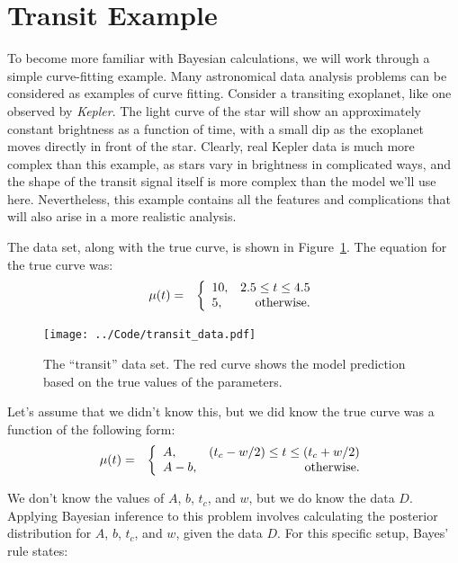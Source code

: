 \section{Transit Example}
To become more familiar with Bayesian calculations, we will work through a
simple curve-fitting example. Many astronomical data analysis problems can be
considered as examples of curve fitting. Consider a transiting exoplanet, like
one observed by {\it Kepler}. The light curve of the star will show an
approximately constant brightness as a function of time, with a small dip as
the exoplanet moves directly in front of the star. Clearly, real Kepler data
is much more complex than this example, as stars vary in brightness in
complicated ways, and the shape of the transit signal itself is more complex
than the model we'll use here. Nevertheless, this example contains all the
features and complications that will also arise in a more realistic analysis.

The data set, along with the true curve, is shown in 
Figure~\ref{fig:transit_data}. The equation for the true curve was:
\begin{eqnarray*}
\mu(t) &=& \left\{
\begin{array}{lr}
10, & 2.5 \leq t \leq 4.5\\
5,  & \textnormal{otherwise}.
\end{array}
\right.
\end{eqnarray*}

\begin{figure}
\begin{center}
\texttt{[image: ../Code/transit\_data.pdf]}
\caption{The ``transit'' data set. The red curve shows the model prediction
based on the true values of the parameters.\label{fig:transit_data}}
\end{center}
\end{figure}

Let's assume that we didn't know this, but we did know the true curve
was a function of the following form:
\begin{eqnarray*}
\mu(t) &=& \left\{
\begin{array}{lr}
A, & (t_c - w/2) \leq t \leq (t_c + w/2)\\
A-b,  & \textnormal{otherwise}.
\end{array}
\right.
\end{eqnarray*}

We don't know the values of $A$, $b$, $t_c$, and $w$,
but we do know the data $D$. Applying Bayesian inference to this problem
involves calculating the posterior distribution for $A$, $b$, $t_c$, and $w$,
given the data $D$. For this specific setup, Bayes' rule states:

